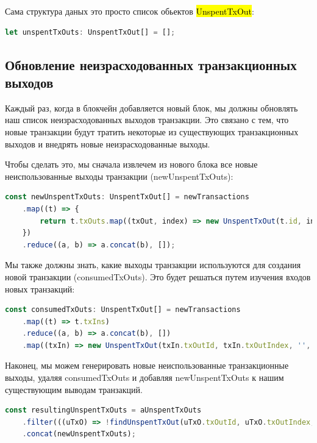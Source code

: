 \documentclass{article}
\begin{document}
Сама структура даных это просто список обьектов \hl{UnspentTxOut}:


\begin{lstlisting}[language=JavaScript]
let unspentTxOuts: UnspentTxOut[] = [];
\end{lstlisting}


\subsection{Обновление неизрасходованных транзакционных выходов}

Каждый раз, когда в блокчейн добавляется новый блок, мы должны обновлять наш список неизрасходованных выходов транзакции. Это связано с тем, что новые транзакции будут тратить некоторые из существующих транзакционных выходов и внедрять новые неизрасходованные выходы.

Чтобы сделать это, мы сначала извлечем из нового блока все новые неиспользованные выходы транзакции (newUnspentTxOuts):




\begin{lstlisting}[language=JavaScript]
const newUnspentTxOuts: UnspentTxOut[] = newTransactions
	.map((t) => {
		return t.txOuts.map((txOut, index) => new UnspentTxOut(t.id, index, txOut.address, txOut.amount));
	})
	.reduce((a, b) => a.concat(b), []);
\end{lstlisting}

Мы также должны знать, какие выходы транзакции используются для создания новой транзакции (consumedTxOuts). Это будет решаться путем изучения входов новых транзакций:

\begin{lstlisting}[language=JavaScript]
const consumedTxOuts: UnspentTxOut[] = newTransactions
	.map((t) => t.txIns)
	.reduce((a, b) => a.concat(b), [])
	.map((txIn) => new UnspentTxOut(txIn.txOutId, txIn.txOutIndex, '', 0));

\end{lstlisting}

Наконец, мы можем генерировать новые неиспользованные транзакционные выходы, удаляя consumedTxOuts и добавляя newUnspentTxOuts к нашим существующим выводам транзакций.

\begin{lstlisting}[language=JavaScript]
const resultingUnspentTxOuts = aUnspentTxOuts
	.filter(((uTxO) => !findUnspentTxOut(uTxO.txOutId, uTxO.txOutIndex, consumedTxOuts)))
	.concat(newUnspentTxOuts);
\end{lstlisting}
\end{document}
